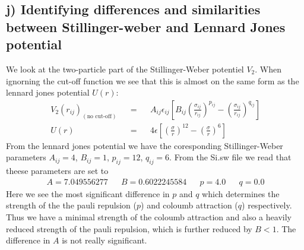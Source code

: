 \documentclass[reprint, amsmath, amssymb, aps]{revtex4-2}
\begin{document}
\subsection*{j) Identifying differences and similarities between Stillinger-weber and Lennard Jones potential}
We look at the two-particle part of the Stillinger-Weber potentiel $V_2$. When ignorning the cut-off function we see that this is almost on the same form as the lennard jones potential $U(r)$:
\begin{align*}
  &V_2(r_{ij})_{(\text{no cut-off})}& &=& &A_{ij}\epsilon_{ij}\left[ B_{ij}\left(\frac{\sigma_{ij}}{r_{ij}}\right)^{p_{ij}} - \left(\frac{\sigma_{ij}}{r_{ij}}\right)^{q_{ij}} \right]& \\
  &U(r)& &=& &4\epsilon \left[\left(\frac{\sigma}{r}\right)^{12} - \left(\frac{\sigma}{r}\right)^{6}\right]&
\end{align*}
From the lennard jones potential we have the coresponding Stillinger-Weber parameters $A_{ij} = 4$, $B_{ij} = 1$, $p_{ij} = 12$, $q_{ij} = 6$. From the Si.sw file we read that theese parameters are set to
\begin{align*}
  &A = 7.049556277& &B = 0.6022245584& &p = 4.0& &q = 0.0&
\end{align*}
Here we see the most significant difference in $p$ and $q$ which determines the strength of the the pauli repulsion ($p$) and coloumb attraction ($q$) respectively. Thus we have a minimal strength of the coloumb attraction and also a heavily reduced strength of the pauli repulsion, which is further reduced by $B < 1$. The difference in $A$ is not really significant.
%
%
\end{document}
